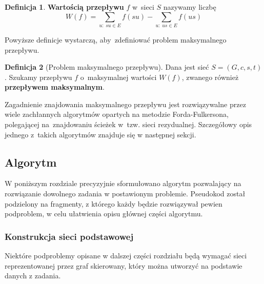 \documentclass[12pt,a4paper]{article}
\theoremstyle{definition}
\newtheorem{defn}{Definicja}
\begin{document}
\begin{defn}
\textbf{Wartością przepływu} $f$ w~sieci $S$ nazywamy liczbę
$$ W(f) = \sum_{u: \; su \in E} f(su) - \sum_{u: \; us \in E} f(us) $$
\end{defn}

\noindent
Powyższe definicje wystarczą, aby~zdefiniować problem maksymalnego przepływu.

\begin{defn}[Problem maksymalnego przepływu]
Dana jest sieć $S = (G,c,s,t)$. Szukamy przepływu $f$ o~maksymalnej wartości
$W(f)$, zwanego również \textbf{przepływem maksymalnym}.
\end{defn}

\noindent
Zagadnienie znajdowania maksymalnego przepływu jest rozwiązywalne przez
wiele zachłannych algorytmów opartych na metodzie Forda-Fulkersona,
polegającej na~znajdowaniu ścieżek w~tzw. sieci rezydualnej. Szczegółowy
opis jednego z~takich algorytmów znajduje się w następnej sekcji.

\subsection{Algorytm}
\label{sec:algorithm}
W poniższym rozdziale precyzyjnie sformułowano algorytm pozwalający na rozwiązanie dowolnego zadania w postawionym problemie. Pseudokod został podzielony na fragmenty, z którego każdy będzie rozwiązywał pewien podproblem, w celu ułatwienia opisu głównej części algorytmu.

\subsubsection{Konstrukcja sieci podstawowej}
Niektóre podproblemy opisane w dalszej części rozdziału będą wymagać sieci reprezentowanej przez graf skierowany, który można utworzyć na podstawie danych z zadania.
\end{document}
